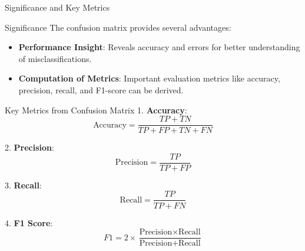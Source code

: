 \documentclass[aspectratio=169]{beamer}
\begin{document}
\begin{frame}[fragile]{Significance and Key Metrics}
    \begin{block}{Significance}
        The confusion matrix provides several advantages:
        \begin{itemize}
            \item \textbf{Performance Insight}: Reveals accuracy and errors for better understanding of misclassifications.
            \item \textbf{Computation of Metrics}: Important evaluation metrics like accuracy, precision, recall, and F1-score can be derived.
        \end{itemize}
    \end{block}

    \begin{block}{Key Metrics from Confusion Matrix}
        1. \textbf{Accuracy}:
        \[
        \text{Accuracy} = \frac{TP + TN}{TP + FP + TN + FN}
        \]

        2. \textbf{Precision}:
        \[
        \text{Precision} = \frac{TP}{TP + FP}
        \]

        3. \textbf{Recall}:
        \[
        \text{Recall} = \frac{TP}{TP + FN}
        \]

        4. \textbf{F1 Score}:
        \[
        F1 = 2 \times \frac{\text{Precision} \times \text{Recall}}{\text{Precision} + \text{Recall}}
        \]
    \end{block}
\end{frame}
\end{document}
